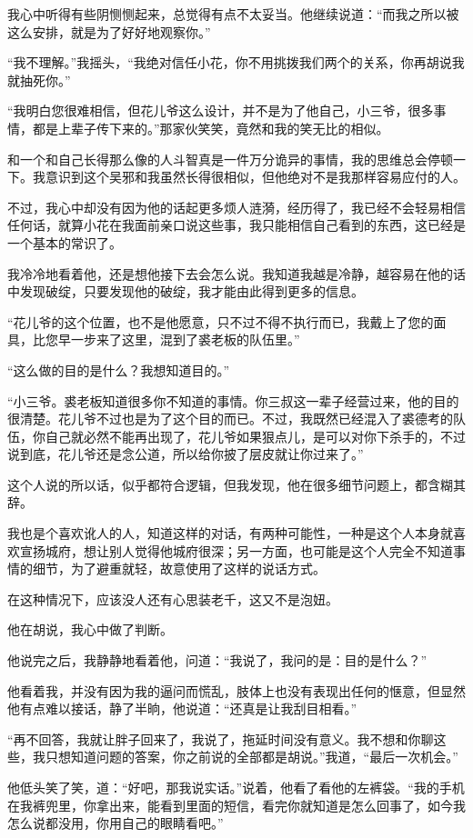 我心中听得有些阴恻恻起来，总觉得有点不太妥当。他继续说道：“而我之所以被这么安排，就是为了好好地观察你。”

“我不理解。”我摇头，“我绝对信任小花，你不用挑拨我们两个的关系，你再胡说我就抽死你。”

“我明白您很难相信，但花儿爷这么设计，并不是为了他自己，小三爷，很多事情，都是上辈子传下来的。”那家伙笑笑，竟然和我的笑无比的相似。

和一个和自己长得那么像的人斗智真是一件万分诡异的事情，我的思维总会停顿一下。我意识到这个吴邪和我虽然长得很相似，但他绝对不是我那样容易应付的人。

不过，我心中却没有因为他的话起更多烦人涟漪，经历得了，我已经不会轻易相信任何话，就算小花在我面前亲口说这些事，我只能相信自己看到的东西，这已经是一个基本的常识了。

我冷冷地看着他，还是想他接下去会怎么说。我知道我越是冷静，越容易在他的话中发现破绽，只要发现他的破绽，我才能由此得到更多的信息。

“花儿爷的这个位置，也不是他愿意，只不过不得不执行而已，我戴上了您的面具，比您早一步来了这里，混到了裘老板的队伍里。”

“这么做的目的是什么？我想知道目的。”

“小三爷。裘老板知道很多你不知道的事情。你三叔这一辈子经营过来，他的目的很清楚。花儿爷不过也是为了这个目的而已。不过，我既然已经混入了裘德考的队伍，你自己就必然不能再出现了，花儿爷如果狠点儿，是可以对你下杀手的，不过说到底，花儿爷还是念公道，所以给你披了层皮就让你过来了。”

这个人说的所以话，似乎都符合逻辑，但我发现，他在很多细节问题上，都含糊其辞。

我也是个喜欢讹人的人，知道这样的对话，有两种可能性，一种是这个人本身就喜欢宣扬城府，想让别人觉得他城府很深；另一方面，也可能是这个人完全不知道事情的细节，为了避重就轻，故意使用了这样的说话方式。

在这种情况下，应该没人还有心思装老千，这又不是泡妞。

他在胡说，我心中做了判断。

他说完之后，我静静地看着他，问道：“我说了，我问的是：目的是什么？”

他看着我，并没有因为我的逼问而慌乱，肢体上也没有表现出任何的惬意，但显然他有点难以接话，静了半晌，他说道：“还真是让我刮目相看。”

“再不回答，我就让胖子回来了，我说了，拖延时间没有意义。我不想和你聊这些，我只想知道问题的答案，你之前说的全部都是胡说。”我道，“最后一次机会。”

他低头笑了笑，道：“好吧，那我说实话。”说着，他看了看他的左裤袋。“我的手机在我裤兜里，你拿出来，能看到里面的短信，看完你就知道是怎么回事了，如今我怎么说都没用，你用自己的眼睛看吧。”

